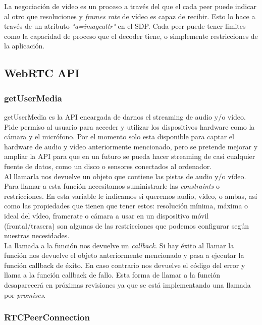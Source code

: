 La negociación de vídeo es un proceso a través del que el cada peer puede indicar al otro que resoluciones y \textit{frames rate} de vídeo es capaz de recibir. Esto lo hace a través de un atributo \textit{"a=imageattr"} en el SDP. Cada peer puede tener limites como la capacidad de proceso que el decoder tiene, o simplemente restricciones de la aplicación.\\


\subsection{WebRTC API}

\subsubsection{getUserMedia} 

getUserMedia es la API encargada de darnos el streaming de audio y/o vídeo. Pide permiso al usuario para acceder y utilizar los dispositivos hardware como la cámara y el micrófono. Por el momento solo esta disponible para captar el hardware de audio y vídeo anteriormente mencionado, pero se pretende mejorar y ampliar la API para que en un futuro se pueda hacer streaming de casi cualquier fuente de datos, como un disco o sensores conectados al ordenador.\\

Al llamarla nos devuelve un objeto que contiene las pistas de audio y/o vídeo. Para llamar a esta función necesitamos suministrarle las \textit{constraints} o restricciones. En esta variable le indicamos si queremos audio, vídeo, o ambas, así como las propiedades que tienen que tener estos: resolución mínima, máxima o ideal del vídeo, framerate o cámara a usar en un dispositivo móvil (frontal/trasera) son algunas de las restricciones que podemos configurar según nuestras necesidades.\\

La llamada a la función nos devuelve un \textit{callback}. Si hay éxito al llamar la función nos devuelve el objeto anteriormente mencionado y pasa a ejecutar la función callback de éxito. En caso contrario nos devuelve el código del error y llama a la función callback de fallo. Esta forma de llamar a la función desaparecerá en próximas revisiones ya que se está implementando una llamada por \textit{promises}.\\


\subsubsection{RTCPeerConnection}

